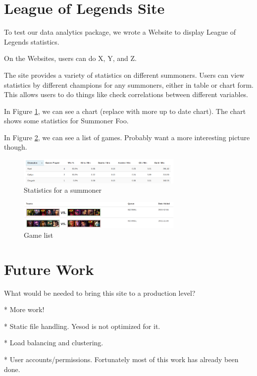 \documentclass{chi2009}
\begin{document}
\section{League of Legends Site}
\label{site}

To test our data analytics package, we wrote a Website to display League of Legends statistics.

On the Websites, users can do X, Y, and Z. 

The site provides a variety of statistics on different summoners. Users can view statistics by different champions for any summoners, either in table or chart form. This allows users to do things like check correlations between different variables. 

In Figure \ref{chart}, we can see a chart (replace with more up to date chart). The chart shows some statistics for Summoner Foo. 

In Figure \ref{list}, we can see a list of games. Probably want a more interesting picture though.

\begin{figure}[h]
    \includegraphics[width=80mm]{imgs/stats.png}
    \caption{Statistics for a summoner}
    \label{chart}
\end{figure}

\begin{figure}[h]
    \includegraphics[width=80mm]{imgs/gamelist.png}
    \caption{Game list}
    \label{list}
\end{figure}

\section{Future Work}
\label{future}

What would be needed to bring this site to a production level?

* More work!

* Static file handling.  Yesod is not optimized for it.

* Load balancing and clustering.

* User accounts/permissions.  Fortunately most of this work has already been done.
\end{document}
